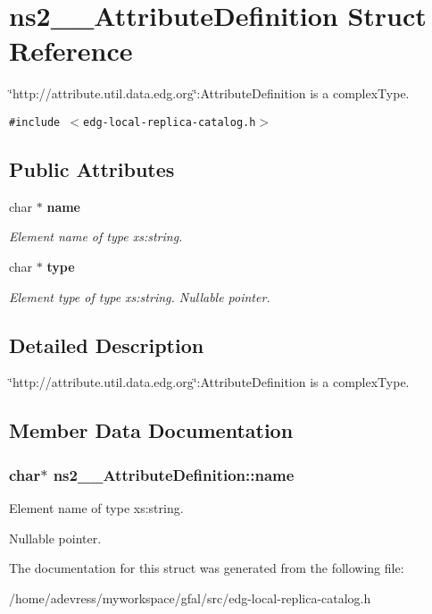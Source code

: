 \section{ns2\_\-\_\-Attribute\-Definition Struct Reference}
\label{structns2____AttributeDefinition}
\char`\"{}http://attribute.util.data.edg.org\char`\"{}:Attribute\-Definition is a complex\-Type.  


{\tt \#include $<$edg-local-replica-catalog.h$>$}

\subsection*{Public Attributes}
\begin{CompactItemize}
\item 
char $\ast$ \bf{name}
\begin{CompactList}\small\item\em Element name of type xs:string. \item\end{CompactList}\item 
char $\ast$ \bf{type}\label{structns2____AttributeDefinition_bc7101ac4ff1f50cd0c0fcf6775ab6b4}

\begin{CompactList}\small\item\em Element type of type xs:string. Nullable pointer. \item\end{CompactList}\end{CompactItemize}


\subsection{Detailed Description}
\char`\"{}http://attribute.util.data.edg.org\char`\"{}:Attribute\-Definition is a complex\-Type. 



\subsection{Member Data Documentation}
\subsubsection{\setlength{\rightskip}{0pt plus 5cm}char$\ast$ \bf{ns2\_\-\_\-Attribute\-Definition::name}}\label{structns2____AttributeDefinition_8f8f5e508f0c5687519da332357f3bf5}


Element name of type xs:string. 

Nullable pointer. 

The documentation for this struct was generated from the following file:\begin{CompactItemize}
\item 
/home/adevress/myworkspace/gfal/src/edg-local-replica-catalog.h\end{CompactItemize}
